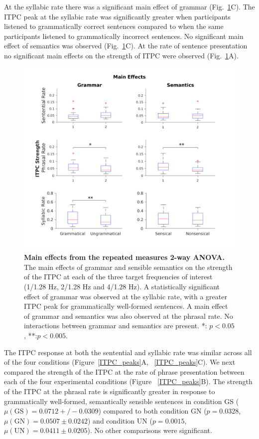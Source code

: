 \documentclass[a4paper,10pt,twoside]{article}
\begin{document}
At the syllabic rate there was a significant main effect of grammar
(Fig.~\ref{MainEffects}C). The ITPC peak at the syllabic rate was
significantly greater when participants listened to grammatically
correct sentences compared to when the same participants listened to
grammatically incorrect sentences. No significant main
effect of semantics was observed (Fig.~\ref{MainEffects}C). At the
rate of sentence presentation no significant main effects on the
strength of ITPC were observed (Fig.~\ref{MainEffects}A).



\begin{figure}[tbp]
\includegraphics[width=\linewidth]{BoxPlots_main_effects.png}
\caption{\textbf{Main effects from the repeated measures 2-way ANOVA.}
  The main effects of grammar and sensible semantics on the strength
  of the ITPC at each of the three target frequencies of interest
  (1/1.28 Hz, 2/1.28 Hz and 4/1.28 Hz). A statistically significant
  effect of grammar was observed at the syllabic rate, with a greater
  ITPC peak for grammatically well-formed sentences.  A main effect of
  grammar and semantics was also observed at the phrasal rate. No interactions
  between grammar and semantics are present. 
  *: $p<0.05$, **:$p<0.005$.  }
\label{MainEffects}
\end{figure}

The ITPC response at both the sentential and syllabic rate was similar
across all of the four conditions (Figure~\ref{ITPC_peaks}A,
~\ref{ITPC_peaks}C). We next compared the strength of the ITPC at the
rate of phrase presentation between each of the four experimental
conditions (Figure ~\ref{ITPC_peaks}B). The strength of the ITPC at
the phrasal rate is significantly greater in response to grammatically
well-formed, semantically sensible sentences in condition GS
($\mu(\mathrm{GS}) = 0.0712 +/- 0.0309$) compared to both condition GN
($p = 0.0328$, $\mu(\mathrm{GN}) = 0.0507 \pm 0.0242$) and condition
UN ($p = 0.0015$, $\mu(\mathrm{UN}) = 0.0411 \pm 0.0205$). No other
comparisons were significant.
\end{document}
